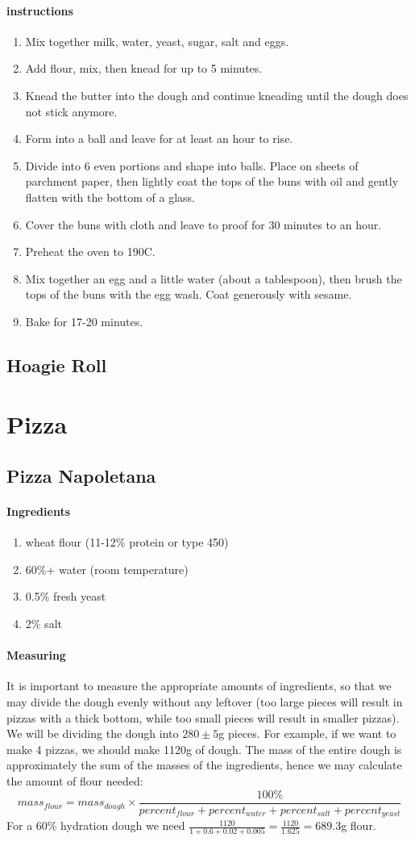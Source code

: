 \documentclass[11pt]{report}
\newcommand{\header}[1]{\subsubsection*{#1}}
\begin{document}
\header{instructions}
\begin{enumerate}
  \item Mix together milk, water, yeast, sugar, salt and eggs.
  \item Add flour, mix, then knead for up to 5 minutes.
  \item Knead the butter into the dough and continue kneading until the dough
  does not stick anymore.
  \item Form into a ball and leave for at least an hour to rise.
  \item Divide into 6 even portions and shape into balls. Place on sheets of
  parchment paper, then lightly coat the tops of the buns with oil and gently
  flatten with the bottom of a glass.
  \item Cover the buns with cloth and leave to proof for 30 minutes to an hour.
  \item Preheat the oven to 190C.
  \item Mix together an egg and a little water (about a tablespoon), then brush
  the tops of the buns with the egg wash. Coat generously with sesame.
  \item Bake for 17-20 minutes.
\end{enumerate}

\section{Hoagie Roll}

\chapter{Pizza}
\section{Pizza Napoletana}

\header{Ingredients}
\begin{enumerate}
  \item wheat flour (11-12\% protein or type 450)
  \item 60\%+ water (room temperature)
  \item 0.5\% fresh yeast
  \item 2\% salt
\end{enumerate}

\header{Measuring}
It is important to measure the appropriate amounts of ingredients, so that we
may divide the dough evenly without any leftover (too large pieces will result
in pizzas with a thick bottom, while too small pieces will result in smaller
pizzas). We will be dividing the dough into $280 \pm 5$g pieces. For example,
if we want to make 4 pizzas, we should make 1120g of dough. The mass of the
  entire dough is approximately the sum of the masses of the ingredients, hence
  we may calculate the amount of flour needed:
$$
mass_{flour} = mass_{dough} \times \frac{100\%}{ percent_{flour} + percent_{water} + percent_{salt} + percent_{yeast} }
$$
For a 60\% hydration dough we need $\frac{1120}{1 + 0.6 + 0.02 + 0.005} =
\frac{1120}{1.625} = 689.3$g flour.
\end{document}
